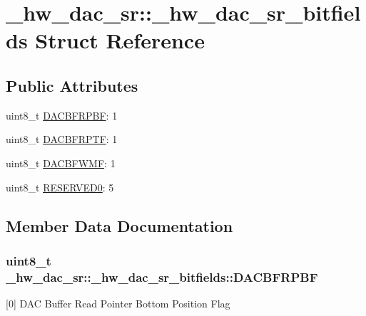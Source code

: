 \hypertarget{struct__hw__dac__sr_1_1__hw__dac__sr__bitfields}{}\section{\+\_\+hw\+\_\+dac\+\_\+sr\+:\+:\+\_\+hw\+\_\+dac\+\_\+sr\+\_\+bitfields Struct Reference}
\label{struct__hw__dac__sr_1_1__hw__dac__sr__bitfields}
\subsection*{Public Attributes}
\begin{DoxyCompactItemize}
\item 
uint8\+\_\+t \hyperlink{struct__hw__dac__sr_1_1__hw__dac__sr__bitfields_a1b0a1783c13daf4222864467613a22ca}{D\+A\+C\+B\+F\+R\+P\+BF}\+: 1
\item 
uint8\+\_\+t \hyperlink{struct__hw__dac__sr_1_1__hw__dac__sr__bitfields_a02d266a08e71ff7707f6a6300bf6661e}{D\+A\+C\+B\+F\+R\+P\+TF}\+: 1
\item 
uint8\+\_\+t \hyperlink{struct__hw__dac__sr_1_1__hw__dac__sr__bitfields_a31fbb213274eca4dbc3e60cb2b789889}{D\+A\+C\+B\+F\+W\+MF}\+: 1
\item 
uint8\+\_\+t \hyperlink{struct__hw__dac__sr_1_1__hw__dac__sr__bitfields_ad4b00e1501283f51ee0daba73e4ac4ad}{R\+E\+S\+E\+R\+V\+E\+D0}\+: 5
\end{DoxyCompactItemize}


\subsection{Member Data Documentation}
\subsubsection[{\texorpdfstring{D\+A\+C\+B\+F\+R\+P\+BF}{DACBFRPBF}}]{\setlength{\rightskip}{0pt plus 5cm}uint8\+\_\+t \+\_\+hw\+\_\+dac\+\_\+sr\+::\+\_\+hw\+\_\+dac\+\_\+sr\+\_\+bitfields\+::\+D\+A\+C\+B\+F\+R\+P\+BF}\hypertarget{struct__hw__dac__sr_1_1__hw__dac__sr__bitfields_a1b0a1783c13daf4222864467613a22ca}{}\label{struct__hw__dac__sr_1_1__hw__dac__sr__bitfields_a1b0a1783c13daf4222864467613a22ca}
\mbox{[}0\mbox{]} D\+AC Buffer Read Pointer Bottom Position Flag 
